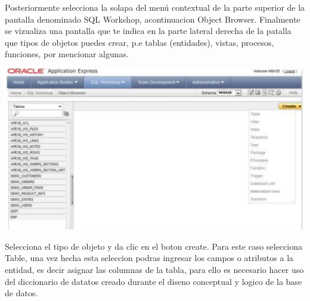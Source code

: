 \documentclass[12pt,letterpaper]{article}
\begin{document}
Posteriormente selecciona la solapa del men\'u contextual de la parte superior de la
pantalla denominado SQL Workshop, acontinuacion Object Browser. Finalmente
se vizualiza una pantalla que te indica en la parte lateral derecha de la patalla que
tipos de objetos puedes crear, p.e tablas (entidades), vistas, procesos, funciones,
por mencionar algunas.
\begin{center}
\includegraphics[width=15cm]{./IMG/img16}
\end{center}
Selecciona el tipo de objeto y da clic en el boton create. Para este
caso selecciona Table, una vez hecha esta seleccion podras ingresar los campos
o atributos a la entidad, es decir asignar las columnas de la tabla, para ello es
necesario hacer uso del diccionario de datatos creado durante el diseno conceptual
y logico de la base de datos. 
\end{document}
